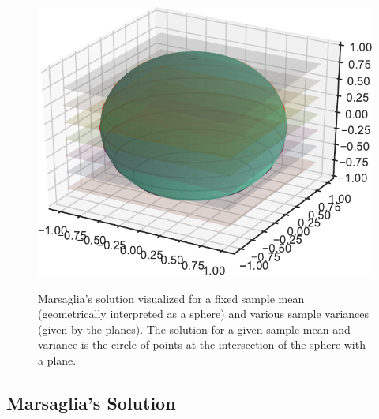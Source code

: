 \documentclass[12pt, a4paper]{article}
\begin{document}
\begin{figure}[H]
    \centering
    \caption{Marsaglia's solution visualized for a fixed sample mean (geometrically interpreted as a sphere) and various sample variances
    (given by the planes). The solution for a given sample mean and variance is the circle of points at the intersection of the sphere with a plane.}
    \includegraphics[scale=1.3]{../figures/sphere-crop.pdf}
    \label{fig:sphere}
\end{figure}

    \subsection{Marsaglia's Solution} \label{sec:2.1}
\end{document}
